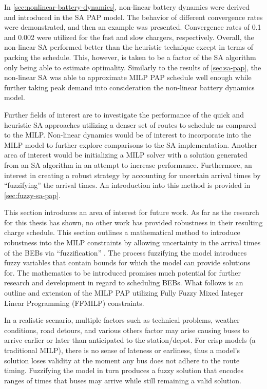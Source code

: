 \documentclass[ee,thesis]{usuthesis}
\begin{document}
In \ref{sec:nonlinear-battery-dynamics}, non-linear battery dynamics were derived and introduced in the SA PAP model. The
behavior of different convergence rates were demonstrated, and then an example was presented. Convergence rates of 0.1
and 0.002 were utilized for the fast and slow chargers, respectively. Overall, the non-linear SA performed better than
the heuristic technique except in terms of packing the schedule. This, however, is taken to be a factor of the SA
algorithm only being able to estimate optimality. Similarly to the results of \ref{sec:sa-pap}, the non-linear SA was able to
approximate MILP PAP schedule well enough while further taking peak demand into consideration the non-linear battery
dynamics model.

Further fields of interest are to investigate the performance of the quick and heuristic SA approaches utilizing a
denser set of routes to schedule as compared to the MILP. Non-linear dynamics would be of interest to incorporate into
the MILP model to further explore comparisons to the SA implementation. Another area of interest would be initializing a
MILP solver with a solution generated from an SA algorithm in an attempt to increase performance. Furthermore, an
interest in creating a robust strategy by accounting for uncertain arrival times by ``fuzzifying'' the arrival times. An
introduction into this method is provided in \ref{sec:fuzzy-sa-pap}.

\makeappendices
{}
\label{sec:fuzzy-sa-pap}

This section introduces an area of interest for future work. As far as the research for this thesis has shown, no other
work has provided robustness in their resulting charge schedule. This section outlines a mathematical method to
introduce robustness into the MILP constraints by allowing uncertainty in the arrival times of the BEBs via
``fuzzification'' \cite{kaur-2016-introd-fuzzy,bello-2019-fuzzy-activ}. The process fuzzifying the model introduces
fuzzy variables that contain bounds for which the model can provide solutions for. The mathematics to be introduced
promises much potential for further research and development in regard to scheduling BEBs. What follows is an outline
and extension of the MILP PAP utilizing Fully Fuzzy Mixed Integer Linear Programming (FFMILP) constraints.

In a realistic scenario, multiple factors such as technical problems, weather conditions, road detours, and various
others factor may arise causing buses to arrive earlier or later than anticipated to the station/depot. For crisp models
(a traditional MILP), there is no sense of lateness or earliness, thus a model's solution loses validity at the moment
any bus does not adhere to the route timing. Fuzzifying the model in turn produces a fuzzy solution that encodes ranges
of times that buses may arrive while still remaining a valid solution.
\end{document}

